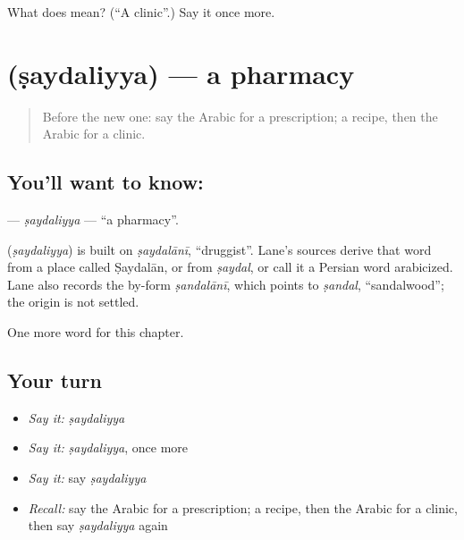 \begin{tcolorbox}[breakable,colback=teal!4,colframe=teal!35!black,title={Before you move on}]
What does  mean? (\textquotedblleft{}A clinic\textquotedblright{}.) Say it once more.
\end{tcolorbox}
\section[\texorpdfstring{\ar{صيدلية} (ṣaydaliyya)}{صيدلية (ṣaydaliyya)}]{ (ṣaydaliyya) — a pharmacy}

\label{lesson:AR-C231-saydaliyya}



\begin{quote}
Before the new one: say the Arabic for a prescription; a recipe, then the Arabic for a clinic.
\end{quote}

\subsection*{You'll want to know: }
\textbf{} — \emph{ṣaydaliyya} — \textquotedblleft{}a pharmacy\textquotedblright{}.

\begin{cousinweb}
\textbf{} (\emph{ṣaydaliyya}) is built on \emph{ṣaydalānī}, \textquotedblleft{}druggist\textquotedblright{}. Lane's sources derive that word from a place called Ṣaydalān, or from \emph{ṣaydal}, or call it a Persian word arabicized. Lane also records the by-form \emph{ṣandalānī}, which points to \emph{ṣandal}, \textquotedblleft{}sandalwood\textquotedblright{}; the origin is not settled.
\end{cousinweb}

\begin{grammarlens}[title={What you've built}]
One more word for this chapter.
\end{grammarlens}

\subsection*{Your turn}
\begin{itemize}
\raggedright
  \item \emph{Say it:} \emph{ṣaydaliyya}
  \item \emph{Say it:} \emph{ṣaydaliyya}, once more
  \item \emph{Say it:} say \emph{ṣaydaliyya}
  \item \emph{Recall:} say the Arabic for a prescription; a recipe, then the Arabic for a clinic, then say \emph{ṣaydaliyya} again
\end{itemize}

